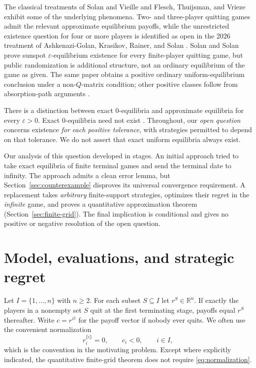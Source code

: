 \documentclass[11pt,a4paper]{article}
\numberwithin{equation}{section}
\theoremstyle{plain}
\theoremstyle{definition}
\theoremstyle{remark}
\newcommand{\eps}{\varepsilon}
\newcommand{\R}{\mathbb R}
\begin{document}
The classical treatments of Solan and Vieille \cite{SolanVieille2001} and
Flesch, Thuijsman, and Vrieze \cite{Flesch1997} exhibit some of the
underlying phenomena. Two- and three-player quitting games admit the
relevant approximate equilibrium payoffs, while the unrestricted existence
question for four or more players is identified as open in the 2026 treatment
of Ashkenazi-Golan, Krasikov, Rainer, and Solan \cite{AKRS2026}.
Solan and Solan \cite{SolanSolan2020} prove sunspot $\eps$-equilibrium
existence for every finite-player quitting game, but public randomization
is additional structure, not an ordinary equilibrium of the game as given.
The same paper obtains a positive ordinary uniform-equilibrium conclusion
under a non-$Q$-matrix condition; other positive classes follow from
absorption-path arguments \cite{AKRS2024,AKRS2026}.

There is a distinction between exact $0$-equilibria and approximate
equilibria for every $\eps>0$. Exact $0$-equilibria need not exist
\cite{Flesch1996,AKRS2026}. Throughout, our \emph{open question} concerns
existence \emph{for each positive tolerance}, with strategies permitted to
depend on that tolerance. We do not assert that exact uniform equilibria
always exist.

Our analysis of this question developed in stages. An initial approach
tried to take exact equilibria of finite terminal games and send the
terminal date to infinity. The approach admits a clean error lemma, but
Section~\ref{sec:counterexample} disproves its universal convergence
requirement. A replacement takes \emph{arbitrary} finite-support strategies,
optimizes their regret in the \emph{infinite} game, and proves a quantitative
approximation theorem (Section~\ref{sec:finite-grid}). The final implication
is conditional and gives no positive or negative resolution of the open
question.

\section{Model, evaluations, and strategic regret}\label{sec:model}
Let $I=\{1,\ldots,n\}$ with $n\ge2$. For each subset $S\subseteq I$ let
$r^S\in\R^n$. If exactly the players in a nonempty set $S$ quit at the
first terminating stage, payoffs equal $r^S$ thereafter. Write
$c=r^\varnothing$ for the payoff vector if nobody ever quits.
We often use the convenient normalization
\begin{equation}\label{eq:normalization}
   r_i^{\{i\}}=0,\qquad c_i<0,\qquad i\in I,
\end{equation}
which is the convention in the motivating problem. Except where explicitly
indicated, the quantitative finite-grid theorem does not require
\eqref{eq:normalization}.
\end{document}
